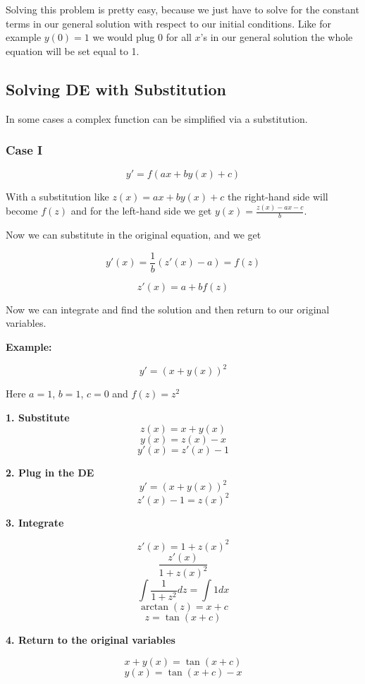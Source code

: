 Solving this problem is pretty easy, because we just have to solve for the constant terms
in our general solution with respect to our initial conditions. Like for example \(y(0) = 1\)
we would plug 0 for all \(x\)'s in our general solution the whole equation will be set equal to 1.

\subsection{Solving DE with Substitution}

In some cases a complex function can be simplified via a substitution.

\subsubsection{Case I}

\[y' = f(ax + by(x) + c)\]

With a substitution like \(z(x) = ax + by(x) + c\) the right-hand side will become \(f(z)\)
and for the left-hand side we get \(y(x) = \frac{z(x) - ax - c}{b}\).
\vspace{\baselineskip}

Now we can substitute in the original equation, and we get

\[y'(x) = \frac{1}{b} (z'(x) - a) = f(z)\]

\[z'(x) = a + b f(z)\]

Now we can integrate and find the solution and then return to our original variables.
\vspace{\baselineskip}

\textbf{Example:}

\[y' = (x + y(x))^2\]

Here \(a = 1\), \(b = 1\), \(c = 0\) and \(f(z) = z^2\)
\vspace{\baselineskip}

\textbf{1. Substitute}
\[
z(x) = x + y(x)
\]
\[y(x) = z(x) - x\]
\[y'(x) = z'(x) - 1\]

\textbf{2. Plug in the DE}
\[y' = {(x + y(x))}^2\]
\[z'(x) - 1 = {z(x)}^2\]

\textbf{3. Integrate}

\[z'(x) = 1 + {z(x)}^2\]
\[\frac{z'(x)}{1 + {z(x)}^2}\]
\[\int \frac{1}{1 + z^2} dz = \int 1 dx\]
\[\arctan (z) = x + c\]
\[z = \tan(x + c)\]

\textbf{4. Return to the original variables}

\[x + y(x) = \tan(x + c)\]
\[y(x) = \tan(x + c) - x\]

